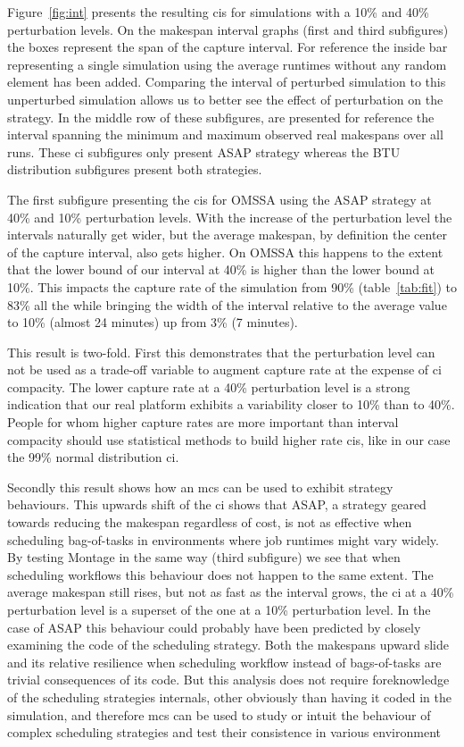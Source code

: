 \documentclass[10pt,conference,compsocconf]{IEEEtran}
\begin{document}
Figure~\ref{fig:int} presents the resulting \acp{ci} for simulations with a 10\%
and 40\% perturbation levels. On the makespan interval graphs (first and third
subfigures) the boxes represent the span of the capture interval. For reference
the inside bar representing a single simulation using the average runtimes
without any random element has been added.  Comparing the interval of perturbed
simulation to this unperturbed simulation allows us to better see the effect of
perturbation on the strategy. In the middle row of these subfigures, are
presented for reference the interval spanning the minimum and maximum observed
real makespans over all runs. These \ac{ci} subfigures only present ASAP
strategy whereas the BTU distribution subfigures  present both strategies.

The first subfigure presenting the \acp{ci} for OMSSA using the ASAP strategy at
40\% and 10\% perturbation levels. With the increase of the perturbation level
the intervals naturally get wider, but the average makespan, by definition the
center of the capture interval, also gets higher. On OMSSA this happens to the
extent that the lower bound of our interval at 40\% is higher than the lower
bound at 10\%. This impacts the capture rate of the simulation from 90\%
(table~\ref{tab:fit}) to 83\% all the while bringing the width of the interval
relative to the average value to 10\% (almost 24 minutes) up from 3\% (7 minutes).

This result is two-fold. First this demonstrates that the perturbation level can
not be used as a trade-off variable to augment capture rate at the expense of
\ac{ci} compacity. The lower capture rate at a 40\% perturbation level is a
strong indication that our real platform exhibits a variability closer to
10\% than to 40\%. People for whom higher capture rates are more important than
interval compacity should use statistical methods to build higher rate \acp{ci},
like in our case the 99\% normal distribution \ac{ci}.

Secondly this result shows how an \ac{mcs} can be used to exhibit strategy
behaviours. This upwards shift of the \ac{ci} shows that ASAP, a strategy
geared towards reducing the makespan regardless of cost, is not as effective
when scheduling bag-of-tasks in environments where job runtimes might vary
widely. By testing Montage in the same way (third subfigure) we see that when
scheduling workflows this behaviour does not happen to the same extent. The
average makespan still rises, but not as fast as the interval grows, the \ac{ci}
at a 40\% perturbation level is a superset of the one at a 10\% perturbation
level. In the case of ASAP this behaviour could probably have been predicted by
closely examining the code of the scheduling strategy. Both the makespans upward
slide and its relative resilience when scheduling workflow instead of
bags-of-tasks are trivial consequences of its code. But this analysis does not
require foreknowledge of the scheduling strategies internals, other obviously
than having it coded in the simulation, and therefore \ac{mcs} can be used to
study or intuit the behaviour of complex scheduling strategies and test their
consistence in various environment 
\end{document}
